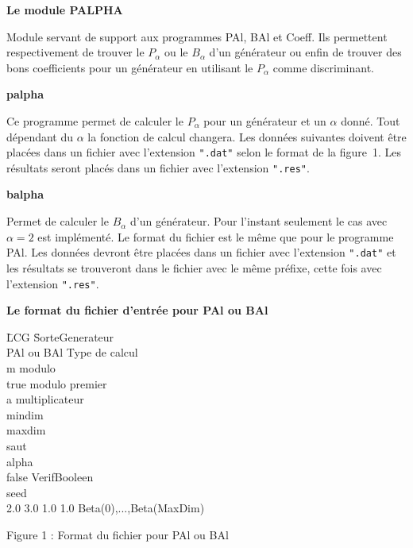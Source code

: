 \large
{\bf Le module PALPHA}
\normalsize

Module servant de support aux programmes PAl, BAl et Coeff. Ils permettent
respectivement de trouver le $P_\alpha$ ou  le $B_\alpha$ d'un g\'en\'erateur
ou enfin de trouver des bons coefficients pour un g\'en\'erateur en
utilisant le $P_\alpha$ comme discriminant.  

\large
{\bf palpha}
\normalsize

Ce programme permet de calculer le $P_\alpha$ pour un 
g\'en\'erateur et un $\alpha$ donn\'e. 
Tout d\'ependant du
$\alpha$
la fonction de calcul changera. Les donn\'ees suivantes doivent \^etre
plac\'ees dans un fichier avec l'extension {\tt".dat"} selon le format de
la figure~1.  Les r\'esultats seront plac\'es dans un fichier  avec l'extension {\tt".res"}.

\large
{\bf balpha}
\normalsize

Permet de calculer le $B_\alpha$ d'un g\'en\'erateur.  Pour l'instant
seulement le cas avec $\alpha = 2$ est impl\'ement\'e.  Le format du
fichier est le m\^eme que pour le programme PAl. Les donn\'ees devront
\^etre plac\'ees dans un fichier avec l'extension {\tt".dat"} et les
r\'esultats se trouveront dans le fichier avec le m\^eme pr\'efixe,
cette fois avec l'extension {\tt".res"}.

\noindent
{\bf Le format du fichier d'entr\'ee pour PAl ou BAl}

\begin{center}
\it{
\begin{tabbing}
\hspace{2cm}\= LCG \hspace{3cm} \= SorteGenerateur \\
\>PAl ou BAl \>   Type de calcul \\
     \>      m  modulo\\
\>true    \>      modulo premier\\
      \>      a  multiplicateur\\
       \>      mindim\\
      \>      maxdim\\
      \>      saut \\ 
       \>      alpha\\
\>false   \>      VerifBooleen\\
       \>      seed\\
 2.0 3.0 1.0 1.0 \> Beta(0),...,Beta(MaxDim)\\
\end{tabbing}
}
\rm {Figure 1 : Format du fichier pour PAl ou BAl}
\end{center}

